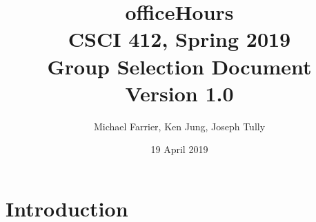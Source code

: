 \documentclass[11pt]{article} %
\begin{document}
\title{officeHours\\ CSCI 412, Spring 2019\\ Group Selection Document \\ Version 1.0}
\author{Michael Farrier, Ken Jung, Joseph Tully}
\date{19 April 2019}
\maketitle

\section{Introduction}
\end{document}
